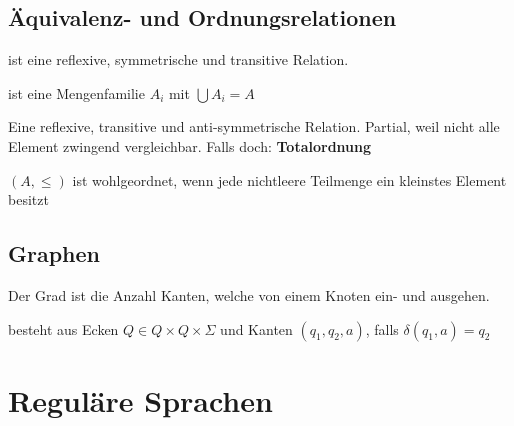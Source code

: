 \documentclass[a4paper]{article}
\begin{document}
\newpage
\subsection{Äquivalenz- und Ordnungsrelationen}
	\begin{multicols}{2}
	
	\begin{fdef}[Äquivalenzrelation]
	ist eine reflexive, symmetrische und transitive Relation.
	\end{fdef}
	
	\begin{fdef}[Partition]
	    ist eine Mengenfamilie $A_i$ mit $\bigcup A_i = A$
	\end{fdef}

	\begin{fdef}[Partialordnung]
	    Eine reflexive, transitive und anti-symmetrische Relation.
	    Partial, weil nicht alle Element zwingend vergleichbar. Falls doch: \textbf{Totalordnung}
	\end{fdef}
	
	\begin{feig}[Wohlgeordnet]
	    $(A, \le)$ ist wohlgeordnet, wenn jede nichtleere Teilmenge ein kleinstes Element besitzt
	\end{feig}

	\end{multicols}

\subsection{Graphen}
	\begin{multicols}{2}
	
	\begin{fdef}
	Der Grad ist die Anzahl Kanten, welche von einem Knoten ein- und ausgehen.
	\end{fdef}
	
	\begin{fdef}
	besteht aus Ecken $Q \in Q \times Q \times \Sigma$ und Kanten $(q_1,q_2, a)$, falls $\delta(q_1, a) = q_2$
	\end{fdef}

	\end{multicols}


\newpage
\section{Reguläre Sprachen}
\end{document}
